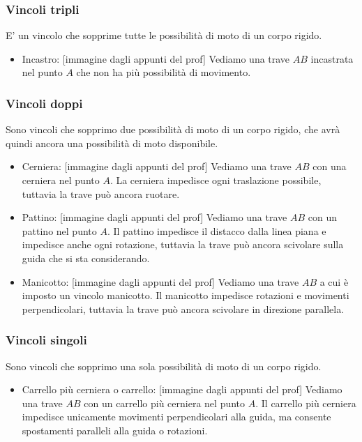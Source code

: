 \subsubsection{Vincoli tripli}
E' un vincolo che sopprime tutte le possibilità di moto di un corpo rigido.
\begin{itemize}
    \item Incastro: [immagine dagli appunti del prof]\newline
    Vediamo una trave $AB$ incastrata nel punto $A$ che non ha più possibilità di movimento. 
\end{itemize}
\subsubsection{Vincoli doppi}
Sono vincoli che sopprimo due possibilità di moto di un corpo rigido, che avrà quindi ancora una possibilità di moto disponibile.
\begin{itemize}
    \item Cerniera: [immagine dagli appunti del prof]\newline
    Vediamo una trave $AB$ con una cerniera nel punto $A$. La cerniera impedisce ogni traslazione possibile, tuttavia la trave può ancora ruotare.
    \item Pattino: [immagine dagli appunti del prof]\newline
    Vediamo una trave $AB$ con un pattino nel punto $A$. Il pattino impedisce il distacco dalla linea piana e impedisce anche ogni rotazione, tuttavia la trave può ancora scivolare sulla guida che si sta considerando.
    \item Manicotto: [immagine dagli appunti del prof]\newline
    Vediamo una trave $AB$ a cui è imposto un vincolo manicotto. Il manicotto impedisce rotazioni e movimenti perpendicolari, tuttavia la trave può ancora scivolare in direzione parallela.
\end{itemize}
\subsubsection{Vincoli singoli}
Sono vincoli che sopprimo una sola possibilità di moto di un corpo rigido.
\begin{itemize}
    \item Carrello più cerniera o carrello: [immagine dagli appunti del prof]\newline
    Vediamo una trave $AB$ con un carrello più cerniera nel punto $A$. Il carrello più cerniera impedisce unicamente movimenti perpendicolari alla guida, ma consente spostamenti paralleli alla guida o rotazioni.
\end{itemize}